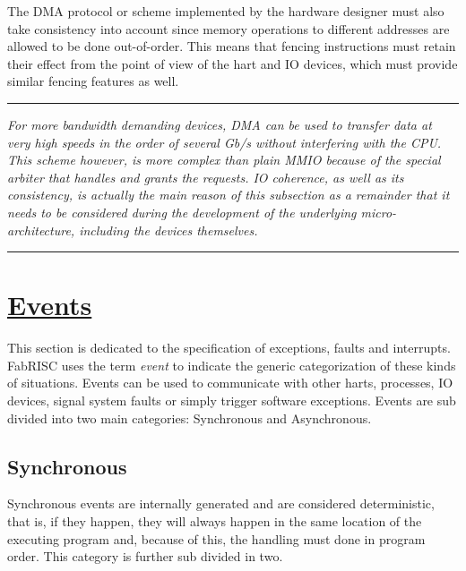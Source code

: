 \documentclass{article}
\begin{document}
            The DMA protocol or scheme implemented by the hardware designer must also take consistency into account since memory operations to different addresses are allowed to be done out-of-order. This means that fencing instructions must retain their effect from the point of view of the hart and IO devices, which must provide similar fencing features as well.

        \par\noindent\rule{\textwidth}{0.4pt}
        \textit{For more bandwidth demanding devices, DMA can be used to transfer data at very high speeds in the order of several Gb/s without interfering with the CPU. This scheme however, is more complex than plain MMIO because of the special arbiter that handles and grants the requests. IO coherence, as well as its consistency, is actually the main reason of this subsection as a remainder that it needs to be considered during the development of the underlying micro-architecture, including the devices themselves.}
        \par\noindent\rule{\textwidth}{0.4pt}

    \clearpage

    \section[Events]{\LARGE\underline{Events}} %

        This section is dedicated to the specification of exceptions, faults and interrupts. FabRISC uses the term \textit{event} to indicate the generic categorization of these kinds of situations. Events can be used to communicate with other harts, processes, IO devices, signal system faults or simply trigger software exceptions. Events are sub divided into two main categories: Synchronous and Asynchronous.

        \subsection{Synchronous}

            Synchronous events are internally generated and are considered deterministic, that is, if they happen, they will always happen in the same location of the executing program and, because of this, the handling must done in program order. This category is further sub divided in two.
\end{document}
